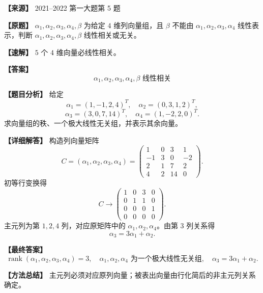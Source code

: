 \documentclass[11pt,a4paper,UTF8]{ctexart}
\newcommand{\rank}{\operatorname{rank}}
\begin{document}
\begin{answerbox}
\textbf{【来源】} 2021--2022 第一大题第 5 题

\textbf{【原题】}
$\alpha_1,\alpha_2,\alpha_3,\alpha_4,\beta$ 为给定 $4$ 维列向量组，且 $\beta$ 不能由 $\alpha_1,\alpha_2,\alpha_3,\alpha_4$ 线性表示，判断 $\alpha_1,\alpha_2,\alpha_3,\alpha_4,\beta$ 线性相关或无关。

\textbf{【速解】}
$5$ 个 $4$ 维向量必线性相关。

\textbf{【答案】}
\[\alpha_1,\alpha_2,\alpha_3,\alpha_4,\beta\text{ 线性相关}\]
\end{answerbox}

\begin{answerbox}
\textbf{【题目分析】} 给定
\[
\alpha_1=(1,-1,2,4)^T,\quad
\alpha_2=(0,3,1,2)^T,
\]
\[
\alpha_3=(3,0,7,14)^T,\quad
\alpha_4=(1,-2,2,0)^T.
\]
求向量组的秩、一个极大线性无关组，并表示其余向量。

\textbf{【详细解答】} 构造列向量矩阵
\[
C=(\alpha_1,\alpha_2,\alpha_3,\alpha_4)
=\begin{pmatrix}
1&0&3&1\\
-1&3&0&-2\\
2&1&7&2\\
4&2&14&0
\end{pmatrix}.
\]
初等行变换得
\[
C\to
\begin{pmatrix}
1&0&3&0\\
0&1&1&0\\
0&0&0&1\\
0&0&0&0
\end{pmatrix}.
\]
主元列为第 $1,2,4$ 列，对应原矩阵中的 $\alpha_1,\alpha_2,\alpha_4$。由第 $3$ 列关系得
\[
\alpha_3=3\alpha_1+\alpha_2.
\]

\textbf{【最终答案】}
\[
\rank(\alpha_1,\alpha_2,\alpha_3,\alpha_4)=3,
\quad \alpha_1,\alpha_2,\alpha_4\text{ 为一个极大线性无关组},
\quad \alpha_3=3\alpha_1+\alpha_2.
\]

\textbf{【方法总结】} 主元列必须对应原列向量；被表出向量由行化简后的非主元列关系确定。
\end{answerbox}
\end{document}
